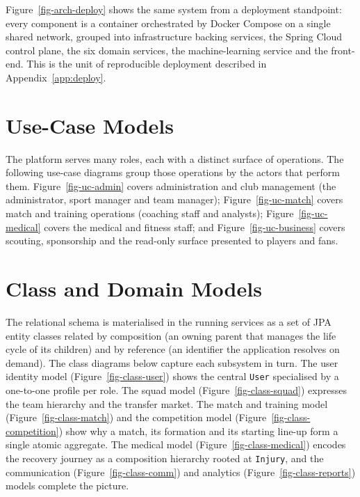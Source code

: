 

Figure~\ref{fig-arch-deploy} shows the same system from a deployment standpoint:
every component is a container orchestrated by Docker Compose on a single shared
network, grouped into infrastructure backing services, the Spring Cloud control
plane, the six domain services, the machine-learning service and the front-end.
This is the unit of reproducible deployment described in Appendix~\ref{app:deploy}.



\section{Use-Case Models}
\label{sec:design-usecase}

The platform serves many roles, each with a distinct surface of operations.
The following use-case diagrams group those operations by the actors that
perform them. Figure~\ref{fig-uc-admin} covers administration and club
management (the administrator, sport manager and team manager);
Figure~\ref{fig-uc-match} covers match and training operations (coaching staff
and analysts); Figure~\ref{fig-uc-medical} covers the medical and fitness staff;
and Figure~\ref{fig-uc-business} covers scouting, sponsorship and the read-only
surface presented to players and fans.






\section{Class and Domain Models}
\label{sec:design-class}

The relational schema is materialised in the running services as a set of JPA
entity classes related by composition (an owning parent that manages the life
cycle of its children) and by reference (an identifier the application resolves
on demand). The class diagrams below capture each subsystem in turn. The user
identity model (Figure~\ref{fig-class-user}) shows the central \texttt{User}
specialised by a one-to-one profile per role. The squad model
(Figure~\ref{fig-class-squad}) expresses the team hierarchy and the transfer
market. The match and training model (Figure~\ref{fig-class-match}) and the
competition model (Figure~\ref{fig-class-competition}) show why a match, its
formation and its starting line-up form a single atomic aggregate. The medical
model (Figure~\ref{fig-class-medical}) encodes the recovery journey as a
composition hierarchy rooted at \texttt{Injury}, and the communication
(Figure~\ref{fig-class-comm}) and analytics (Figure~\ref{fig-class-reports})
models complete the picture.

